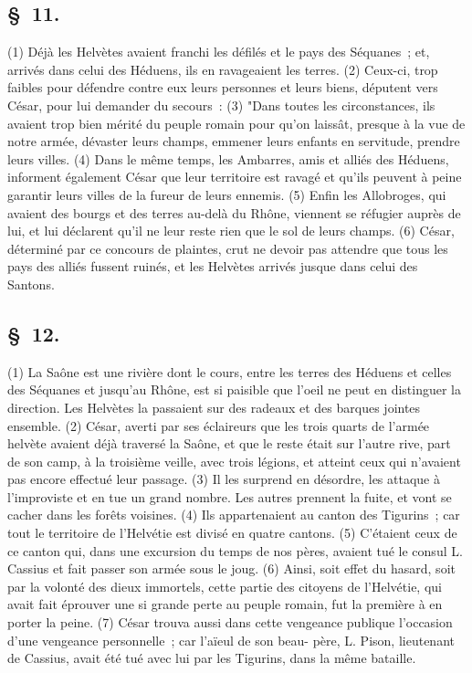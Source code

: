 \documentclass[french,twoside]{book} %
\begin{document}
\subsection[{§ 11.}]{ \textsc{§ 11.} }
\noindent (1) Déjà les Helvètes avaient franchi les défilés et le pays des Séquanes ; et, arrivés dans celui des Héduens, ils en ravageaient les terres. (2) Ceux-ci, trop faibles pour défendre contre eux leurs personnes et leurs biens, députent vers César, pour lui demander du secours : (3) "Dans toutes les circonstances, ils avaient trop bien mérité du peuple romain pour qu’on laissât, presque à la vue de notre armée, dévaster leurs champs, emmener leurs enfants en servitude, prendre leurs villes. (4) Dans le même temps, les Ambarres, amis et alliés des Héduens, informent également César que leur territoire est ravagé et qu’ils peuvent à peine garantir leurs villes de la fureur de leurs ennemis. (5) Enfin les Allobroges, qui avaient des bourgs et des terres au-delà du Rhône, viennent se réfugier auprès de lui, et lui déclarent qu’il ne leur reste rien que le sol de leurs champs. (6) César, déterminé par ce concours de plaintes, crut ne devoir pas attendre que tous les pays des alliés fussent ruinés, et les Helvètes arrivés jusque dans celui des Santons.
\subsection[{§ 12.}]{ \textsc{§ 12.} }
\noindent (1) La Saône est une rivière dont le cours, entre les terres des Héduens et celles des Séquanes et jusqu’au Rhône, est si paisible que l’oeil ne peut en distinguer la direction. Les Helvètes la passaient sur des radeaux et des barques jointes ensemble. (2) César, averti par ses éclaireurs que les trois quarts de l’armée helvète avaient déjà traversé la Saône, et que le reste était sur l’autre rive, part de son camp, à la troisième veille, avec trois légions, et atteint ceux qui n’avaient pas encore effectué leur passage. (3) Il les surprend en désordre, les attaque à l’improviste et en tue un grand nombre. Les autres prennent la fuite, et vont se cacher dans les forêts voisines. (4) Ils appartenaient au canton des Tigurins ; car tout le territoire de l’Helvétie est divisé en quatre cantons. (5) C'étaient ceux de ce canton qui, dans une excursion du temps de nos pères, avaient tué le consul L. Cassius et fait passer son armée sous le joug. (6) Ainsi, soit effet du hasard, soit par la volonté des dieux immortels, cette partie des citoyens de l’Helvétie, qui avait fait éprouver une si grande perte au peuple romain, fut la première à en porter la peine. (7) César trouva aussi dans cette vengeance publique l’occasion d’une vengeance personnelle ; car l’aïeul de son beau- père, L. Pison, lieutenant de Cassius, avait été tué avec lui par les Tigurins, dans la même bataille.
\end{document}
